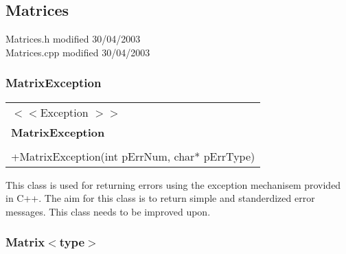 \subsection{Matrices}
{\footnotesize Matrices.h modified  30/04/2003 \\
 Matrices.cpp modified 30/04/2003}
 
\subsubsection{MatrixException}
\begin{table}[h]
\begin{tabular}{|l|}\hline
$<<$Exception $>>$\\
\textbf{MatrixException}\\
\hline
\\
\hline
+MatrixException(int pErrNum, char* pErrType)\\
\hline
\end{tabular}
\end{table}

This class is used for returning errors using the exception mechanisem provided in C++. The aim for this class is to return simple and standerdized error messages. This class needs to be improved upon.

\subsubsection{Matrix$<$type$>$}

